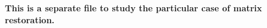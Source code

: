 \documentclass{article}
\begin{document}
\textbf{This is a separate file to study the particular case of matrix restoration.}

\end{document}
